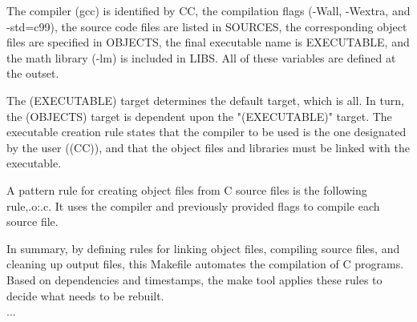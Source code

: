 \documentclass[12pt]{article}
\begin{document}
The compiler (gcc) is identified by CC, the compilation flags (-Wall, -Wextra, and -std=c99), the source code files are listed in SOURCES, the corresponding object files are specified in OBJECTS, the final executable name is EXECUTABLE, and the math library (-lm) is included in LIBS. All of these variables are defined at the outset.

The (EXECUTABLE) target determines the default target, which is all. In turn, the (OBJECTS) target is dependent upon the "(EXECUTABLE)" target. The executable creation rule states that the compiler to be used is the one designated by the user ((CC)), and that the object files and libraries must be linked with the executable.

A pattern rule for creating object files from C source files is the following rule,.o:.c. It uses the compiler and previously provided flags to compile each source file.

In summary, by defining rules for linking object files, compiling source files, and cleaning up output files, this Makefile automates the compilation of C programs. Based on dependencies and timestamps, the make tool applies these rules to decide what needs to be rebuilt.\\
...
\end{document}
